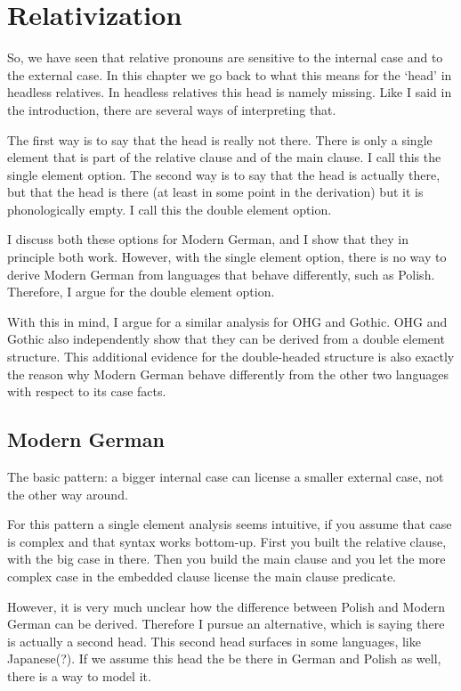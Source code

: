 
\chapter{Relativization}\label{ch:relativization}

So, we have seen that relative pronouns are sensitive to the internal case and to the external case. In this chapter we go back to what this means for the `head' in headless relatives. In headless relatives this head is namely missing. Like I said in the introduction, there are several ways of interpreting that.

The first way is to say that the head is really not there. There is only a single element that is part of the relative clause and of the main clause. I call this the single element option. The second way is to say that the head is actually there, but that the head is there (at least in some point in the derivation) but it is phonologically empty. I call this the double element option.

I discuss both these options for Modern German, and I show that they in principle both work. However, with the single element option, there is no way to derive Modern German from languages that behave differently, such as Polish. Therefore, I argue for the double element option.

With this in mind, I argue for a similar analysis for OHG and Gothic. OHG and Gothic also independently show that they can be derived from a double element structure. This additional evidence for the double-headed structure is also exactly the reason why Modern German behave differently from the other two languages with respect to its case facts.




\section{Modern German}

The basic pattern: a bigger internal case can license a smaller external case, not the other way around.

For this pattern a single element analysis seems intuitive, if you assume that case is complex and that syntax works bottom-up. First you built the relative clause, with the big case in there. Then you build the main clause and you let the more complex case in the embedded clause license the main clause predicate.

However, it is very much unclear how the difference between Polish and Modern German can be derived. Therefore I pursue an alternative, which is saying there is actually a second head. This second head surfaces in some languages, like Japanese(?). If we assume this head the be there in German and Polish as well, there is a way to model it.



